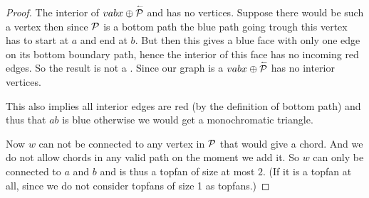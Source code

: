 \begin{proof}
      The interior of  $vabx \oplus \rev \P$ and has no vertices. Suppose there would be such a vertex then since $\P$ is a bottom path the blue path going trough this vertex has to start at $a$ and end at $b$. But then this gives a blue face with only one edge on its bottom boundary path, hence the interior of this face has no incoming red edges.  So the result is not a \rel. Since our graph is a \rel $vabx \oplus \rev \P$ has no interior vertices.

      This also implies all interior edges are red (by the definition of bottom path) and thus that $ab$ is blue otherwise we would get a monochromatic triangle.

      Now $w$ can not be connected to any vertex in $\P$ that would give a chord. And we do not allow chords in any valid path on the moment we add it. So $w$ can only be connected to $a$ and $b$ and is thus a topfan of size at most $2$. (If it is a topfan at all, since we do not consider topfans of size 1 as topfans.)
    \end{proof}
